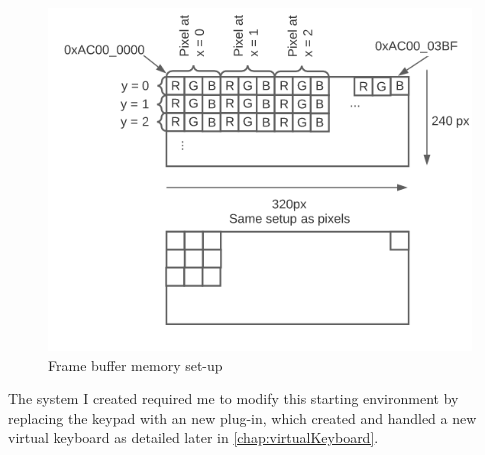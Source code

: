 \begin{figure}[ht!]
	\includegraphics[width=\linewidth]{figures/LCD.png}\centering
	\caption{Frame buffer memory set-up}
	\label{fig:LCDMem}
\end{figure}

The system I created required me to modify this starting environment by replacing the keypad with an new plug-in, which created and handled a new virtual keyboard as detailed later in \autoref{chap:virtualKeyboard}. 
